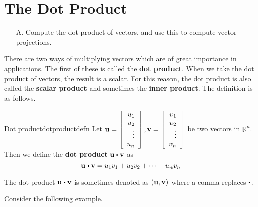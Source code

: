 \section{The Dot Product}

\begin{outcome}

\begin{enumerate}
\item[A.] Compute the dot product of vectors, and use this to compute vector projections.
\end{enumerate}
\end{outcome}

There are two ways of multiplying vectors which are of great importance in
applications. The first of these is called the \textbf{dot product}. When we take the dot product of vectors, the 
result is a scalar. For this reason, the dot product is also
called the \textbf{scalar product }and sometimes the \textbf{inner product}. The definition is as follows.

\begin{definition}{Dot product}{dotproductdefn}
Let ${\bf u}=\left[ 
\begin{array}{r}
u_1 \\
u_2 \\
\vdots \\
u_n 
\end{array}
\right] ,{\bf v}= \left[ 
\begin{array}{r}
v_1 \\
v_2 \\
\vdots \\
v_n 
\end{array}
\right]$ be two vectors in $\mathbb{R}^{n}$. Then we
define the \textbf{dot product}  $\vect{u}\dotprod \vect{v}$ as
\begin{equation*}
\vect{u}\dotprod \vect{v} = u_1v_1+u_2v_2+\cdots+u_nv_n
\end{equation*}
\end{definition}

The dot product $\vect{u}\dotprod \vect{v}$ is sometimes denoted as $({\bf u},{\bf v})$ where a comma replaces $\dotprod $.

Consider the following example.

